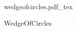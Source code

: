 \documentclass[12pt,a4paper]{article}
\newcommand{\incfig}[1]{%
    \def\svgwidth{\columnwidth}
    {#1.pdf_tex}
}
\begin{document}
\begin{figure}[ht]
    \centering
    \incfig{wedgeofcircles}
    \caption{WedgeOfCircles}
    \label{fig:wedgeofcircles}
\end{figure}
\end{document}
